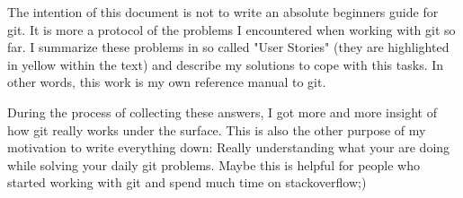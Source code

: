 The intention of this document is not to write an absolute beginners guide for git. It is more a protocol of 
the problems I encountered when working with git so far. I summarize these problems in so called "User Stories"
(they are highlighted in yellow within the text) and describe my solutions to cope with this tasks. In other words, 
this work is my own reference manual to git.


During the process of collecting these answers, I got more and more insight of how git really works under the surface. 
This is also the other purpose of my motivation to write everything down: Really understanding what your are doing while solving 
your daily git problems. Maybe this is helpful for people who started working with git and spend much time on stackoverflow;)